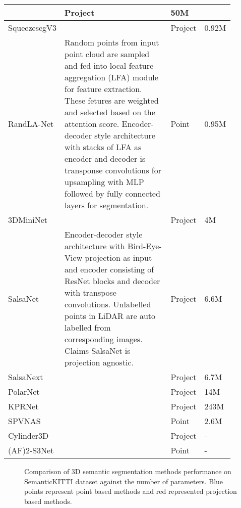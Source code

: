 \begin{table}[h!]
\begin{tabular}{|p{0.15\linewidth} | p{0.6\linewidth}| p{0.06\linewidth} |p{0.08\linewidth}|}
        & Project & 50M \\
        \hline
        SqueezesegV3\cite{xu2020squeezesegv3} & & Project & 0.92M \\
        \hline
        RandLA-Net\cite{Hu_2020_CVPR_Randla} & 
        Random points from input point cloud are sampled and fed into local feature aggregation (LFA) module for feature extraction.
        These fetures are weighted and selected based on the attention score. 
        Encoder-decoder style architecture with stacks of LFA as encoder and decoder is transponse convolutions for upsampling with MLP followed by fully connected layers for segmentation.
        & Point & 0.95M \\
        \hline 
        3DMiniNet\cite{3Dmininet} & & Project & 4M \\
        \hline
        SalsaNet\cite{salsanet2020} & Encoder-decoder style architecture with Bird-Eye-View projection as input and encoder consisting of ResNet blocks and decoder with transpose convolutions.
        Unlabelled points in LiDAR are auto labelled from corresponding images. Claims SalsaNet is projection agnostic.
        & Project & 6.6M \\
        \hline
        SalsaNext\cite{SalsaNext_2020} & & Project & 6.7M \\
        \hline
        PolarNet\cite{polarnet} & & Project & 14M \\
        \hline
        KPRNet\cite{kochanov2020kprnet} & & Project & 243M \\
        \hline
        SPVNAS\cite{spvnas} & & Point & 2.6M \\
        \hline
        Cylinder3D\cite{zhu2020cylindrical} & & Project & - \\
        \hline
        (AF)2-S3Net\cite{af2s3net} & & Point & - \\
        \hline

    \end{tabular}
\end{table}
\begin{figure}[h!]
    \centering
    
    \caption{Comparison of 3D semantic segmentation methods performance on SemanticKITTI dataset against the number of parameters. 
             Blue points represent point based methods and red represented projection based methods.}
\end{figure}


\newpage


